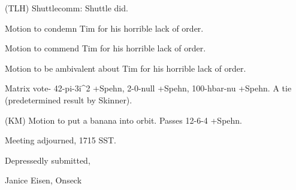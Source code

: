 \documentclass[12pt]{article}
\begin{document}
(TLH) Shuttlecomm: Shuttle did.

Motion to condemn Tim for his horrible lack of order.

Motion to commend Tim for his horrible lack of order.

Motion to be ambivalent about Tim for his horrible lack of order.

Matrix vote- 42-pi-3i^2 +Spehn, 2-0-null +Spehn, 100-hbar-nu +Spehn. A tie (predetermined result by Skinner).

(KM) Motion to put a banana into orbit. Passes 12-6-4 +Spehn.

\vspace{12pt}

\noindent
Meeting adjourned, 1715 SST.

\vspace{18pt}

\centerline{Depressedly submitted,}
\centerline{Janice Eisen, Onseck}
\end{document}

